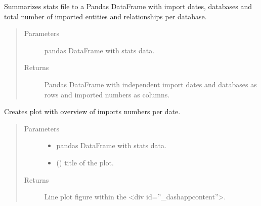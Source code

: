 \documentclass[letterpaper,10pt,english]{sphinxmanual}
\begin{document}
\begin{fulllineitems}
\label{\detokenize{_autosummary/report_manager.apps:report_manager.apps.imports.get_imports_per_database_date}}
Summarizes stats file to a Pandas DataFrame with import dates, databases and total number of     imported entities and relationships per database.
\begin{quote}\begin{description}
\item[{Parameters}] \leavevmode
{} \textendash{} pandas DataFrame with stats data.

\item[{Returns}] \leavevmode
Pandas DataFrame with independent import dates and databases as rows and imported numbers as columns.

\end{description}\end{quote}

\end{fulllineitems}


\begin{fulllineitems}
\label{\detokenize{_autosummary/report_manager.apps:report_manager.apps.imports.plot_total_number_imported}}
Creates plot with overview of imports numbers per date.
\begin{quote}\begin{description}
\item[{Parameters}] \leavevmode\begin{itemize}
\item {} 
 \textendash{} pandas DataFrame with stats data.

\item {} 
 () \textendash{} title of the plot.

\end{itemize}

\item[{Returns}] \leavevmode
Line plot figure within the \textless{}div id=”\_dash\sphinxhyphen{}app\sphinxhyphen{}content”\textgreater{}.

\end{description}\end{quote}

\end{fulllineitems}
\end{document}
